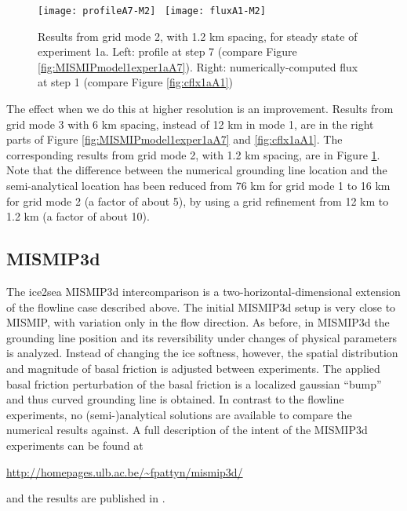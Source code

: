 \begin{figure}[ht]
\centering
\texttt{[image: profileA7-M2]} \,
\texttt{[image: fluxA1-M2]}
\caption{Results from grid mode 2, with 1.2 km spacing, for steady state of experiment 1a.  Left: profile at step 7 (compare Figure \ref{fig:MISMIPmodel1exper1aA7}).  Right: numerically-computed flux at step 1 (compare Figure \ref{fig:cflx1aA1})}
\label{fig:MISMIPmode2results}
\end{figure}

The effect when we do this at higher resolution is an improvement.  Results from grid mode 3 with 6 km spacing, instead of 12 km in mode 1, are in the right parts of Figure \ref{fig:MISMIPmodel1exper1aA7} and \ref{fig:cflx1aA1}.  The corresponding results from grid mode 2, with 1.2 km spacing, are in Figure \ref{fig:MISMIPmode2results}.  Note that the difference between the numerical grounding line location and the semi-analytical location has been reduced from 76 km for grid mode 1 to 16 km for grid mode 2 (a factor of about 5), by using a grid refinement from 12 km to 1.2 km (a factor of about 10).


\subsection{MISMIP3d}\label{subsect:MISMIP3d}
The ice2sea MISMIP3d intercomparison is a two-horizontal-dimensional extension of the flowline case described above.  The initial MISMIP3d setup is very close to MISMIP, with variation only in the flow direction.  As before, in MISMIP3d the grounding line position and its reversibility under changes of physical parameters is analyzed.  Instead of changing the ice softness, however, the spatial distribution and magnitude of basal friction is adjusted between experiments.  The applied basal friction perturbation of the basal friction is a localized gaussian ``bump'' and thus curved grounding line is obtained.  In contrast to the flowline experiments, no (semi-)analytical solutions are available to compare the numerical results against.  A full description of the intent of the MISMIP3d experiments can be found at

\centerline{\url{http://homepages.ulb.ac.be/~fpattyn/mismip3d/}}

\noindent and the results are published in \cite{MISMIP3d2013}.

